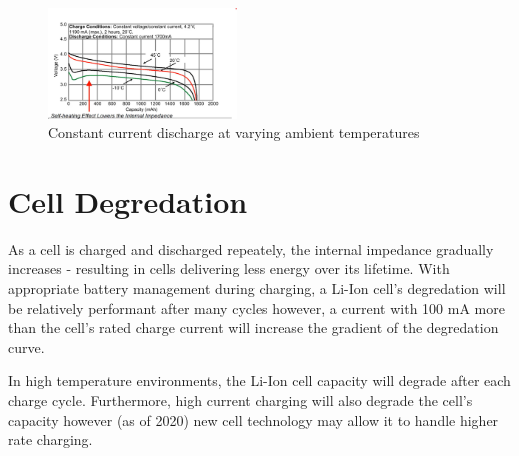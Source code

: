 \documentclass[]{report}
\begin{document}
\begin{figure}[h]
    \centering
    \includegraphics[width=5cm]{discharge_curve2.png}
    \caption{Constant current discharge at varying ambient temperatures}
    \label{discharge_varying_temp}
\end{figure}

\section{Cell Degredation}
As a cell is charged and discharged repeately, the internal impedance gradually increases - resulting in cells delivering less energy over its lifetime. With appropriate battery management during charging, a Li-Ion cell's degredation will be relatively performant after many cycles however, a current with 100 mA more than the cell's rated charge current will increase the gradient of the degredation curve. 

In high temperature environments, the Li-Ion cell capacity will degrade after each charge cycle. Furthermore, high current charging will also degrade the cell's capacity however (as of 2020) new cell technology may allow it to handle higher rate charging.
\end{document}
